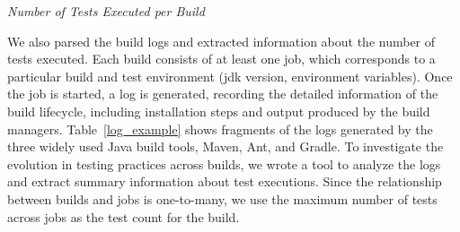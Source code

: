 

\smallskip\noindent\emph{Number of Tests Executed per Build} 

We also parsed the \Tvis build logs and extracted information about the 
number of tests executed. %
Each \Tvis build consists of at least one job, which corresponds to a particular
build and test environment (\eg jdk version, environment variables). 
Once the job is started, a log is generated, recording the detailed information
of the build lifecycle, including installation steps and output produced by the 
build managers. %
Table~\ref{log_example} shows fragments of the logs generated by the 
three widely used Java build tools, Maven, Ant, and Gradle. 
To investigate the evolution in testing practices across builds, we wrote a tool 
to analyze the logs and extract summary information about test executions.  
Since the relationship between builds and jobs is one-to-many, we use the 
maximum number of tests across jobs as the test count for the build. 





